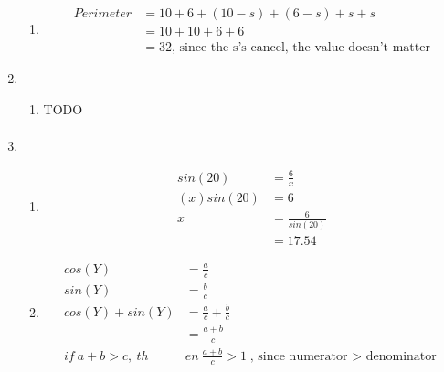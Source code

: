 \documentclass[11pt]{article}
\begin{document}
\begin{enumerate}
\begin{enumerate}
            \item
            \begin{equation*}
                \begin{split}
                    Perimeter&=10+6+(10-s)+(6-s)+s+s\\
                    &=10+10+6+6\\
                    &=32\text{, since the s's cancel, the value doesn't matter}
                \end{split}
            \end{equation*}
        \end{enumerate}

    \pagebreak
    \item
        \begin{enumerate}
            \item TODO
            \begin{equation*}
                \begin{split}
                \end{split}
            \end{equation*}
        \end{enumerate}

    \pagebreak
    \item
        \begin{enumerate}
            \item 
            \begin{equation*}
                \begin{split}
                    sin(20)&=\frac{6}{x}\\
                    (x)sin(20)&=6\\
                    x&=\frac{6}{sin(20)}\\
                    &=17.54
                \end{split}
            \end{equation*}
            
            \item
            \begin{equation*}
                \begin{split}
                    cos(Y)&=\frac{a}{c}\\
                    sin(Y)&=\frac{b}{c}\\
                    cos(Y)+sin(Y)&=\frac{a}{c}+\frac{b}{c}\\
                    &=\frac{a+b}{c}\\
                    if\ a+b>c,\ th&en\ \frac{a+b}{c}>1\text{, since numerator $>$ denominator}
                \end{split}
            \end{equation*}
        \end{enumerate}


\end{enumerate}
\end{document}

